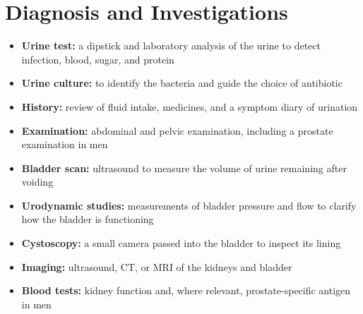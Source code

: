 \section*{Diagnosis and Investigations}
\begin{itemize}
    \item \textbf{Urine test:} a dipstick and laboratory analysis of the urine to detect infection, blood, sugar, and protein
    \item \textbf{Urine culture:} to identify the bacteria and guide the choice of antibiotic
    \item \textbf{History:} review of fluid intake, medicines, and a symptom diary of urination
    \item \textbf{Examination:} abdominal and pelvic examination, including a prostate examination in men
    \item \textbf{Bladder scan:} ultrasound to measure the volume of urine remaining after voiding
    \item \textbf{Urodynamic studies:} measurements of bladder pressure and flow to clarify how the bladder is functioning
    \item \textbf{Cystoscopy:} a small camera passed into the bladder to inspect its lining
    \item \textbf{Imaging:} ultrasound, CT, or MRI of the kidneys and bladder
    \item \textbf{Blood tests:} kidney function and, where relevant, prostate-specific antigen in men
\end{itemize}

